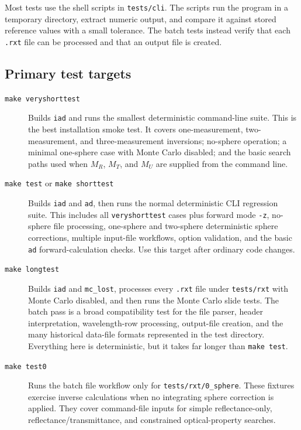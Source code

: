\documentclass{article}
\newcommand\iadprog{\texttt{iad}}
\begin{document}
Most tests use the shell scripts in \texttt{tests/cli}.  The scripts run the
program in a temporary directory, extract numeric output, and compare it against
stored reference values with a small tolerance.  The batch tests instead verify
that each \texttt{.rxt} file can be processed and that an output file is
created.

\subsection{Primary test targets}

\begin{description}
\item[\texttt{make veryshorttest}]
Builds \iadprog{} and runs the smallest deterministic command-line suite.  This
is the best installation smoke test.  It covers one-measurement, two-measurement,
and three-measurement inversions; no-sphere operation; a minimal one-sphere
case with Monte Carlo disabled; and the basic search paths used when $M_R$,
$M_T$, and $M_U$ are supplied from the command line.

\item[\texttt{make test} or \texttt{make shorttest}]
Builds \iadprog{} and \texttt{ad}, then runs the normal deterministic CLI
regression suite.  This includes all \texttt{veryshorttest} cases plus forward
mode \texttt{-z}, no-sphere file processing, one-sphere and two-sphere
deterministic sphere corrections, multiple input-file workflows, option
validation, and the basic \texttt{ad} forward-calculation checks.  Use this
target after ordinary code changes.

\item[\texttt{make longtest}]
Builds \iadprog{} and \texttt{mc\_lost}, processes every \texttt{.rxt} file
under \texttt{tests/rxt} with Monte Carlo disabled, and then runs the Monte
Carlo slide tests.  The batch pass is a broad compatibility test for the file
parser, header interpretation, wavelength-row processing, output-file creation,
and the many historical data-file formats represented in the test directory.
Everything here is deterministic, but it takes far longer than
\texttt{make test}.

\item[\texttt{make test0}]
Runs the batch file workflow only for \texttt{tests/rxt/0\_sphere}.  These
fixtures exercise inverse calculations when no integrating sphere correction is
applied.  They cover command-file inputs for simple reflectance-only,
reflectance/transmittance, and constrained optical-property searches.


\end{description}
\end{document}
